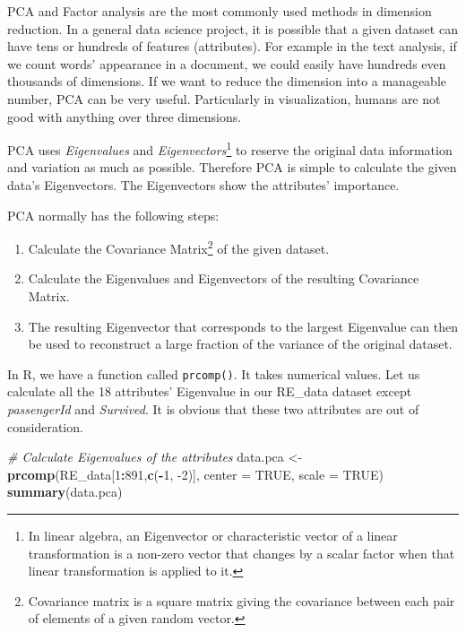 \documentclass[
]{book}
\newenvironment{Shaded}{\begin{snugshade}}{\end{snugshade}}
\newcommand{\CommentTok}[1]{\textcolor[rgb]{0.56,0.35,0.01}{\textit{#1}}}
\newcommand{\DataTypeTok}[1]{\textcolor[rgb]{0.13,0.29,0.53}{#1}}
\newcommand{\DecValTok}[1]{\textcolor[rgb]{0.00,0.00,0.81}{#1}}
\newcommand{\KeywordTok}[1]{\textcolor[rgb]{0.13,0.29,0.53}{\textbf{#1}}}
\newcommand{\NormalTok}[1]{#1}
\newcommand{\OperatorTok}[1]{\textcolor[rgb]{0.81,0.36,0.00}{\textbf{#1}}}
\newcommand{\OtherTok}[1]{\textcolor[rgb]{0.56,0.35,0.01}{#1}}
\newcommand{\StringTok}[1]{\textcolor[rgb]{0.31,0.60,0.02}{#1}}
\providecommand{\tightlist}{%
  \setlength{\itemsep}{0pt}\setlength{\parskip}{0pt}}
\begin{document}
PCA and Factor analysis are the most commonly used methods in dimension reduction. In a general data science project, it is possible that a given dataset can have tens or hundreds of features (attributes). For example in the text analysis, if we count words' appearance in a document, we could easily have hundreds even thousands of dimensions. If we want to reduce the dimension into a manageable number, PCA can be very useful. Particularly in visualization, humans are not good with anything over three dimensions.

PCA uses \emph{Eigenvalues} and \emph{Eigenvectors}\footnote{In linear algebra, an Eigenvector or characteristic vector of a linear transformation is a non-zero vector that changes by a scalar factor when that linear transformation is applied to it.} to reserve the original data information and variation as much as possible. Therefore PCA is simple to calculate the given data's Eigenvectors. The Eigenvectors show the attributes' importance.

PCA normally has the following steps:

\begin{enumerate}
\def\labelenumi{\arabic{enumi}.}
\tightlist
\item
  Calculate the Covariance Matrix\footnote{Covariance matrix is a square matrix giving the covariance between each pair of elements of a given random vector.} of the given dataset.
\item
  Calculate the Eigenvalues and Eigenvectors of the resulting Covariance Matrix.
\item
  The resulting Eigenvector that corresponds to the largest Eigenvalue can then be used to reconstruct a large fraction of the variance of the original dataset.
\end{enumerate}

In R, we have a function called \texttt{prcomp()}. It takes numerical values. Let us calculate all the 18 attributes' Eigenvalue in our RE\_data dataset except \emph{passengerId} and \emph{Survived}. It is obvious that these two attributes are out of consideration.

\begin{Shaded}
\begin{Highlighting}[]
\CommentTok{# Calculate Eigenvalues of the attributes}
\NormalTok{data.pca <-}\StringTok{ }\KeywordTok{prcomp}\NormalTok{(RE_data[}\DecValTok{1}\OperatorTok{:}\DecValTok{891}\NormalTok{,}\KeywordTok{c}\NormalTok{(}\OperatorTok{-}\DecValTok{1}\NormalTok{, }\DecValTok{-2}\NormalTok{)], }\DataTypeTok{center =} \OtherTok{TRUE}\NormalTok{, }\DataTypeTok{scale =} \OtherTok{TRUE}\NormalTok{)}
\KeywordTok{summary}\NormalTok{(data.pca)}
\end{Highlighting}
\end{Shaded}
\end{document}
